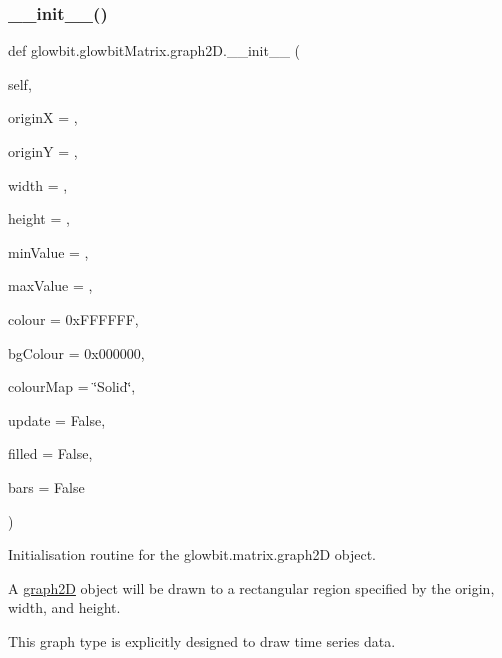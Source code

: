 \subsubsection{\texorpdfstring{\+\_\+\+\_\+init\+\_\+\+\_\+()}{\_\_init\_\_()}}
{\footnotesize\ttfamily def glowbit.\+glowbit\+Matrix.\+graph2\+D.\+\_\+\+\_\+init\+\_\+\+\_\+ (\begin{DoxyParamCaption}\item[{}]{self,  }\item[{}]{originX = {},  }\item[{}]{originY = {},  }\item[{}]{width = {},  }\item[{}]{height = {},  }\item[{}]{min\+Value = {},  }\item[{}]{max\+Value = {},  }\item[{}]{colour = {\ttfamily 0xFFFFFF},  }\item[{}]{bg\+Colour = {\ttfamily 0x000000},  }\item[{}]{colour\+Map = {\ttfamily \char`\"{}Solid\char`\"{}},  }\item[{}]{update = {\ttfamily False},  }\item[{}]{filled = {\ttfamily False},  }\item[{}]{bars = {\ttfamily False} }\end{DoxyParamCaption})}



Initialisation routine for the glowbit.\+matrix.\+graph2D object. 

A \hyperlink{classglowbit_1_1glowbitMatrix_1_1graph2D}{graph2D} object will be drawn to a rectangular region specified by the origin, width, and height.

This graph type is explicitly designed to draw time series data.


